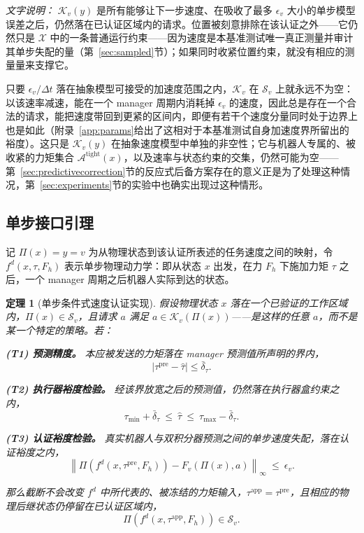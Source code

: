 \documentclass[journal]{IEEEtran}
\newtheorem{theorem}{定理}
\begin{document}
\emph{文字说明：} $\mathcal K_v(y)$ 是所有能够让下一步速度、在吸收了最多 $\epsilon_v$ 大小的单步模型误差之后，仍然落在已认证区域内的请求。位置被刻意排除在该认证之外——它仍然只是 $\mathcal X$ 中的一条普通运行约束——因为速度是本基准测试唯一真正测量并审计其单步失配的量（第~\ref{sec:sampled}节）；如果同时收紧位置约束，就没有相应的测量量来支撑它。

只要 $\epsilon_v/\Delta t$ 落在抽象模型可接受的加速度范围之内，$\mathcal K_v$ 在 $\mathcal S_v$ 上就永远不为空：以该速率减速，能在一个 manager 周期内消耗掉 $\epsilon_v$ 的速度，因此总是存在一个合法的请求，能把速度带回到更紧的区间内，即便有若干个速度分量同时处于边界上也是如此（附录~\ref{app:params}给出了这相对于本基准测试自身加速度界所留出的裕度）。这只是 $\mathcal K_v(y)$ 在抽象速度模型中单独的非空性；它与机器人专属的、被收紧的力矩集合 $\mathcal A^{\mathrm{tight}}(x)$，以及速率与状态约束的交集，仍然可能为空——第~\ref{sec:predictivecorrection}节的反应式后备方案存在的意义正是为了处理这种情况，第~\ref{sec:experiments}节的实验中也确实出现过这种情形。

\subsection{单步接口引理}

记 $\Pi(x)=y=v$ 为从物理状态到该认证所表述的任务速度之间的映射，令 $f^d(x,\tau,F_h)$ 表示单步物理动力学：即从状态 $x$ 出发，在力 $F_h$ 下施加力矩 $\tau$ 之后，一个 manager 周期之后机器人实际到达的状态。

\begin{theorem}[单步条件式速度认证实现]
\label{thm:transfer}
假设物理状态 $x$ 落在一个已验证的工作区域内，$\Pi(x)\in\mathcal S_v$，且请求 $a$ 满足 $a\in\mathcal K_v(\Pi(x))$——是这样的任意 $a$，而不是某一个特定的策略。若：

\textbf{(T1) 预测精度。} 本应被发送的力矩落在 manager 预测值所声明的界内，
\[
\left|\tau^{\mathrm{pre}}-\hat\tau\right|\le\bar\delta_\tau.
\]

\textbf{(T2) 执行器裕度检验。} 经该界放宽之后的预测值，仍然落在执行器盒约束之内，
\[
\tau_{\min}+\bar\delta_\tau\ \le\ \hat\tau\ \le\ \tau_{\max}-\bar\delta_\tau .
\]

\textbf{(T3) 认证裕度检验。} 真实机器人与双积分器预测之间的单步速度失配，落在认证裕度之内，
\[
\left\|\Pi\!\left(f^d(x,\tau^{\mathrm{pre}},F_h)\right)-F_v\!\left(\Pi(x),a\right)\right\|_\infty\ \le\ \epsilon_v .
\]

那么截断不会改变 $f^d$ 中所代表的、被冻结的力矩输入，$\tau^{\mathrm{app}}=\tau^{\mathrm{pre}}$，且相应的物理后继状态仍停留在已认证区域内，
\[
\Pi\!\left(f^d(x,\tau^{\mathrm{app}},F_h)\right)\in\mathcal S_v .
\]
\end{theorem}
\end{document}
